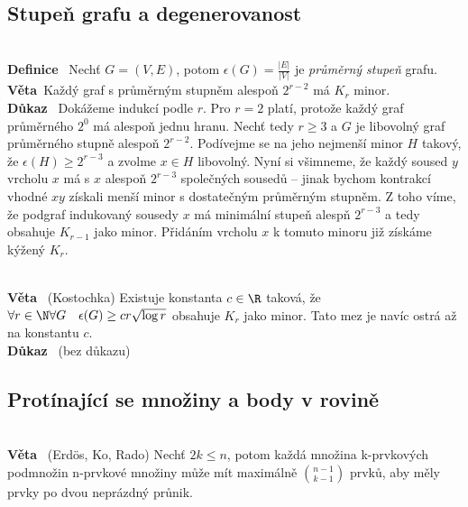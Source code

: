 \documentclass{article}
\renewcommand{\paragraph}[1]{\ \\\smallskip\noindent\textbf{#1}\ }
\begin{document}
\subsection{Stupeň grafu a degenerovanost}
\paragraph{Definice} Nechť $G=(V,E)$, potom $\epsilon(G) = \frac{|E|}{|V|}$ je 
\textit{průměrný stupeň} grafu.
\paragraph{Věta}Každý graf s průměrným stupněm alespoň $2^{r-2}$ má $K_r$ minor.
\paragraph{Důkaz} Dokážeme indukcí podle $r$. Pro $r=2$ platí, protože každý 
graf průměrného $2^0$ má alespoň jednu hranu. Nechť tedy $r \geq 3$ a $G$ je 
libovolný graf průměrného stupně alespoň $2^{r-2}$. Podívejme se na jeho 
nejmenší minor $H$ takový, že $\epsilon(H) \geq 2^{r-3}$ a zvolme $x\in H$
libovolný.
Nyní si všimneme, že každý soused $y$ vrcholu $x$ má s $x$ alespoň $2^{r-3}$ 
společných sousedů -- jinak bychom kontrakcí vhodné $xy$ získali menší minor s 
dostatečným průměrným stupněm. Z toho víme, že podgraf indukovaný sousedy $x$ má 
minimální stupeň alespň $2^{r-3}$ a tedy obsahuje $K_{r-1}$ jako minor. Přidáním 
vrcholu $x$ k tomuto minoru již získáme kýžený $K_r$.

\paragraph{Věta} (Kostochka) Existuje konstanta $c\in\R$ taková, že $\forall 
r\in\N\forall G\quad \epsilon(G) \geq cr\sqrt{\log r}$ obsahuje $K_r$ jako 
minor. Tato mez je navíc ostrá až na konstantu $c$.
\paragraph{Důkaz} (bez důkazu)

\subsection{Protínající se množiny a body v rovině}

\paragraph{Věta} (Erdös, Ko, Rado) Nechť $2k \leq n$, potom každá množina 
k-prvkových podmnožin n-prvkové množiny může mít maximálně $\binom{n-1}{k-1}$ 
prvků, aby měly prvky po dvou neprázdný průnik.
\end{document}
